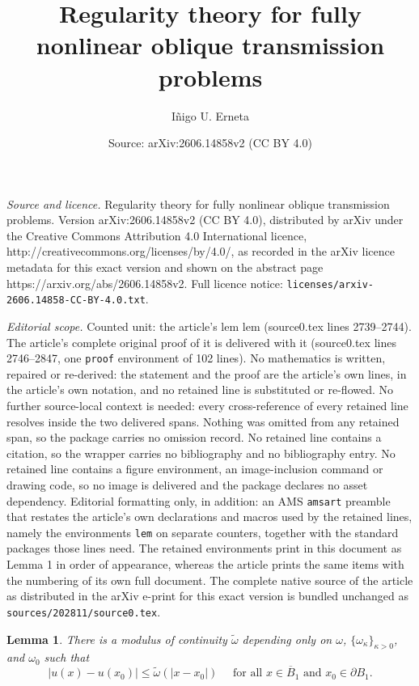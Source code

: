 \documentclass[10pt,a4paper]{amsart}
\title{Regularity theory for fully nonlinear oblique transmission problems}
\author{I\~nigo U. Erneta}
\date{Source: arXiv:2606.14858v2 (CC BY 4.0)}
\newtheorem{lem}{Lemma}
\begin{document}
\maketitle

\noindent\emph{Source and licence.} Regularity theory for fully nonlinear oblique transmission problems. Version arXiv:2606.14858v2 (CC BY 4.0), distributed by arXiv under the Creative Commons Attribution 4.0 International licence, http://creativecommons.org/licenses/by/4.0/, as recorded in the arXiv licence metadata for this exact version and shown on the abstract page https://arxiv.org/abs/2606.14858v2. Full licence notice: \texttt{licenses/arxiv-2606.14858-CC-BY-4.0.txt}.\par\smallskip

\noindent\textit{Editorial scope.} Counted unit: the article's lem lem (source0.tex lines 2739--2744). The article's complete original proof of it is delivered with it (source0.tex lines 2746--2847, one \texttt{proof} environment of 102 lines). No mathematics is written, repaired or re-derived: the statement and the proof are the article's own lines, in the article's own notation, and no retained line is substituted or re-flowed.  No further source-local context is needed: every cross-reference of every retained line resolves inside the two delivered spans.  Nothing was omitted from any retained span, so the package carries no omission record.  No retained line contains a citation, so the wrapper carries no bibliography and no bibliography entry.  No retained line contains a figure environment, an image-inclusion command or drawing code, so no image is delivered and the package declares no asset dependency.  Editorial formatting only, in addition: an AMS \texttt{amsart} preamble that restates the article's own declarations and macros used by the retained lines, namely the environments \texttt{lem} on separate counters, together with the standard packages those lines need.  The retained environments print in this document as Lemma 1 in order of appearance, whereas the article prints the same items with the numbering of its own full document.  The complete native source of the article as distributed in the arXiv e-print for this exact version is bundled unchanged as \texttt{sources/202811/source0.tex}.
\begin{lem}
There is a modulus of continuity $\widetilde{\omega}$ depending only on $\omega$, $\{\omega_{\kappa}\}_{\kappa > 0}$, and $\omega_0$ such that
\[
|u(x) - u(x_0)| \leq \widetilde{\omega}(|x-x_0|) \quad \text{ for all } x \in \overline{B}_{1} \text{ and } x_0 \in \partial B_1.
\]
\end{lem}
\end{document}
